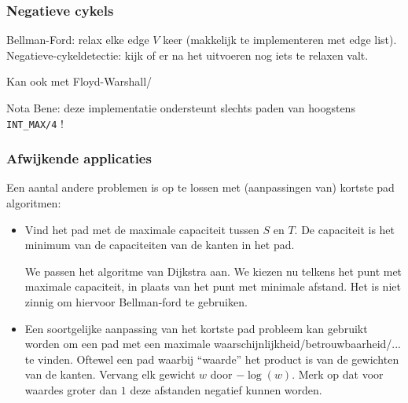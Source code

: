\documentclass[10pt,a4paper,titlepage]{article}
\begin{document}
\subsubsection{Negatieve cykels}
Bellman-Ford: relax elke edge $V$ keer (makkelijk te implementeren met edge list). Negatieve-cykeldetectie: kijk of er na het uitvoeren nog iets te relaxen valt.

Kan ook met Floyd-Warshall/

Nota Bene: deze implementatie ondersteunt slechts paden van hoogstens \lstinline{INT_MAX/4} !

\subsubsection{Afwijkende applicaties}
Een aantal andere problemen is op te lossen met (aanpassingen van) kortste pad algoritmen:

\begin{itemize}[noitemsep,nolistsep]
\item Vind het pad met de maximale capaciteit tussen $S$ en $T$. De capaciteit is het minimum van de capaciteiten van de kanten in het pad.

We passen het algoritme van Dijkstra aan. We kiezen nu telkens het punt met maximale capaciteit, in plaats van het punt met minimale afstand. Het is niet zinnig om hiervoor Bellman-ford te gebruiken.

\item Een soortgelijke aanpassing van het kortste pad probleem kan gebruikt worden om een pad met een maximale waarschijnlijkheid/betrouwbaarheid/... te vinden. Oftewel een pad waarbij ``waarde'' het product is van de gewichten van de kanten. Vervang elk gewicht $w$ door $-\log(w)$. Merk op dat voor waardes groter dan $1$ deze afstanden negatief kunnen worden.

\end{itemize}
\end{document}
